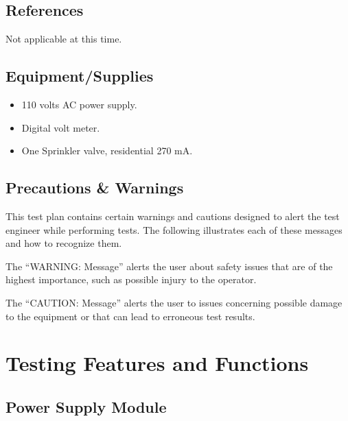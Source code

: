 \documentclass{article}
\begin{document}
\subsection{References}

Not applicable at this time.


\subsection{Equipment/Supplies}

\begin{itemize}
\item 110 volts AC power supply.
\item Digital volt meter.
\item One Sprinkler valve, residential 270 mA.
\end{itemize}

\subsection{Precautions \& Warnings}

This test plan contains certain warnings and cautions designed to alert the
test engineer while performing tests. The following illustrates each of
these messages and how to recognize them.


The ``WARNING: Message'' alerts the user about safety issues that are of
the highest importance, such as possible injury to the operator.


The ``CAUTION: Message'' alerts the user to issues concerning possible
damage to the equipment or that can lead to erroneous test results.


\section{Testing Features and Functions}

\subsection{Power Supply Module}
\end{document}
